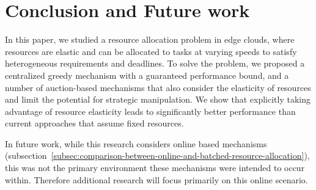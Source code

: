 \section{Conclusion and Future work}\label{sec:conclusion-and-future-work}
In this paper, we studied a resource allocation problem in edge clouds, where resources are elastic and can be
allocated to tasks at varying speeds to satisfy heterogeneous requirements and deadlines. To solve the problem,
we proposed a centralized greedy mechanism with a guaranteed performance bound, and a number of auction-based
mechanisms that also consider the elasticity of resources and limit the potential for strategic manipulation. We show
that explicitly taking advantage of resource elasticity leads to significantly better performance than current
approaches that assume fixed resources.

In future work, while this research considers online based mechanisms
(subsection~\ref{subsec:comparison-between-online-and-batched-resource-allocation}), this was not the primary environment these mechanisms
were intended to occur within. Therefore additional research will focus primarily on this online scenario.
